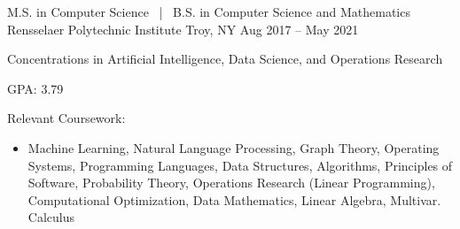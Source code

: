 


\begin{cventries}

  \cventry
  {M.S. in Computer Science \, | \, B.S. in Computer Science and Mathematics}
  {Rensselaer Polytechnic Institute}
  {Troy, NY}
  {Aug 2017 -- May 2021}
  {
    \begin{cvitems}
      \item Concentrations in Artificial Intelligence, Data Science, and Operations Research
      \item GPA: 3.79
      \item Relevant Coursework:
      \begin{itemize}
        \item Machine Learning, Natural Language Processing, Graph Theory, Operating Systems, Programming Languages, Data Structures, Algorithms,
              Principles of Software, Probability Theory, Operations Research (Linear Programming), Computational Optimization, \newline
              Data Mathematics, Linear Algebra, Multivar. Calculus
      \end{itemize}
    \end{cvitems}
  }


\end{cventries}